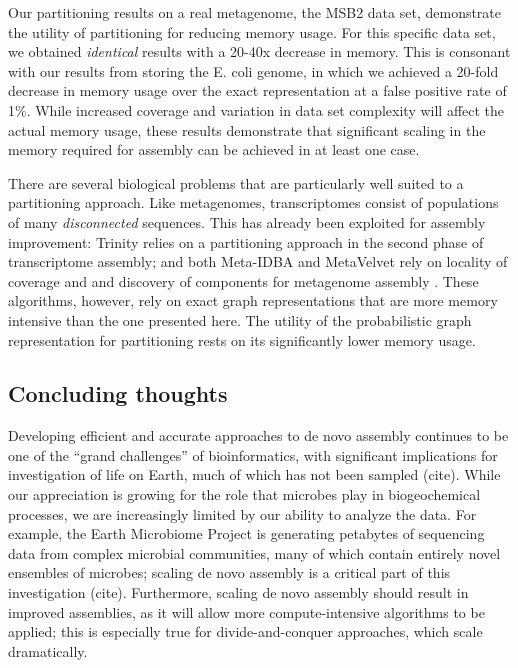 \documentclass{pnastwo}
\begin{document}
\begin{article}
Our partitioning results on a real metagenome, the MSB2 data set,
demonstrate the utility of partitioning for reducing memory usage.
For this specific data set, we obtained {\em identical} results with a
20-40x decrease in memory.  This is consonant with our results from
storing the E. coli genome, in which we achieved a 20-fold decrease
in memory usage over the exact representation at a false positive rate
of 1\%.  While increased coverage and variation in data set complexity
will affect the actual memory usage, these results demonstrate that
significant scaling in the memory required for assembly can be achieved
in at least one case.


There are several biological problems that are particularly well
suited to a partitioning approach.  Like metagenomes, transcriptomes
consist of populations of many {\em disconnected} sequences.  This has
already been exploited for assembly improvement: Trinity relies on a
partitioning approach in the second phase of transcriptome assembly;
and both Meta-IDBA and MetaVelvet rely on locality of coverage and and
discovery of components for metagenome assembly
\cite{trinity,pubmed21685107,metavelvet}.  These algorithms, however,
rely on exact graph representations that are more memory intensive
than the one presented here.  The utility of the probabilistic graph
representation for partitioning rests on its significantly lower
memory usage.

\subsection{Concluding thoughts}


Developing efficient and accurate approaches to de novo assembly
continues to be one of the ``grand challenges'' of bioinformatics,
with significant implications for investigation of life on Earth, much
of which has not been sampled (cite).  While our appreciation is
growing for the role that microbes play in biogeochemical processes,
we are increasingly limited by our ability to analyze the data.  For
example, the Earth Microbiome Project is generating petabytes of
sequencing data from complex microbial communities, many of which
contain entirely novel ensembles of microbes; scaling de novo assembly
is a critical part of this investigation (cite).  Furthermore, scaling
de novo assembly should result in improved assemblies, as it will
allow more compute-intensive algorithms to be applied; this is
especially true for divide-and-conquer approaches, which scale
dramatically.


\end{article}
\end{document}
